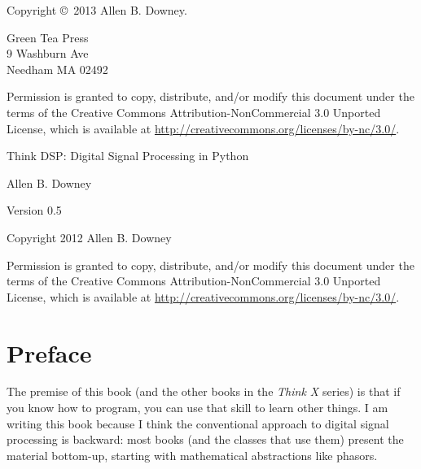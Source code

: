 \documentclass[12pt]{book}
\newcommand{\thetitle}{Think DSP: Digital Signal Processing in Python}
\newcommand{\theversion}{0.5}
\begin{document}
\begin{latexonly}
Copyright \copyright ~2013 Allen B. Downey.


\vspace{0.2in}

\begin{flushleft}
Green Tea Press       \\
9 Washburn Ave \\
Needham MA 02492
\end{flushleft}

Permission is granted to copy, distribute, and/or modify this document
under the terms of the Creative Commons Attribution-NonCommercial 3.0 Unported
License, which is available at \url{http://creativecommons.org/licenses/by-nc/3.0/}.

\vspace{0.2in}

\end{latexonly}



\begin{htmlonly}


{\Large \thetitle}

{\large Allen B. Downey}

Version \theversion

\vspace{0.25in}

Copyright 2012 Allen B. Downey

\vspace{0.25in}

Permission is granted to copy, distribute, and/or modify this document
under the terms of the Creative Commons Attribution-NonCommercial 3.0
Unported License, which is available at
\url{http://creativecommons.org/licenses/by-nc/3.0/}.

\setcounter{chapter}{-1}

\end{htmlonly}

\fi

\chapter{Preface}
\label{preface}

The premise of this book (and the other books in the {\it Think X}
series) is that if you know how to program, you can use that skill to
learn other things.  I am writing this book because I think the
conventional approach to digital signal processing is backward: most
books (and the classes that use them) present the material bottom-up,
starting with mathematical abstractions like phasors.
\end{document}
